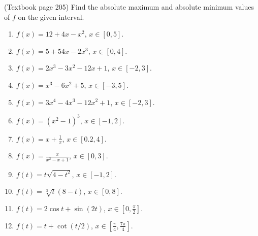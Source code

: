 (Textbook page 205)
Find the absolute maximum and absolute minimum values of $f$ on the given interval.
\begin{multicols}{3}
\begin{enumerate}
\item $\displaystyle f(x)=12+4x-x^2$, $x\in [0,5]$.
\item $\displaystyle f(x)=5+54x-2x^3$, $x\in[0,4] $.
\item $\displaystyle f(x)=2x^3-3x^2-12x+1$, $x\in [-2,3]$.
\item $\displaystyle f(x)=x^3-6x^2+5$, $x\in [-3, 5]$.
\item $\displaystyle f(x)=3x^4-4x^3-12x^2+1$, $x\in [-2, 3]$.
\item $\displaystyle f(x)=(x^2-1)^3$, $x\in [-1, 2]$.
\item $\displaystyle f(x)=x+\frac{1}{x}$, $x\in [0.2,4 ]$.
\item $\displaystyle f(x)=\frac{x}{x^2-x+1}$, $x\in [0,3 ]$.
\item $\displaystyle f(t)=t\sqrt{4-t^2}$, $x\in [-1,2 ]$.
\item $\displaystyle f(t)=\sqrt[3]{t}(8-t) $, $x\in [0,8 ]$.
\item $\displaystyle f(t)=2\cos t+\sin (2t)$, $x\in [0,\frac{\pi}{2} ]$.
\item $\displaystyle f(t)=t+\cot (t/2) $, $x\in [\frac{\pi}{4},\frac{7\pi}{4} ]$.
\end{enumerate}
\end{multicols}
